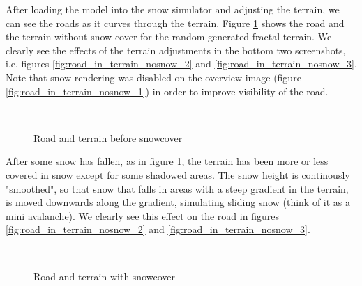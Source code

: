 
After loading the model into the snow simulator and adjusting the terrain, we can see the roads as it curves through the terrain. Figure \ref{fig:road_in_terrain_nosnow} shows the road and the terrain without snow cover for the random generated fractal terrain. We clearly see the effects of the terrain adjustments in the bottom two screenshots, i.e. figures \ref{fig:road_in_terrain_nosnow_2} and \ref{fig:road_in_terrain_nosnow_3}. Note that snow rendering was disabled on the overview image (figure \ref{fig:road_in_terrain_nosnow_1}) in order to improve visibility of the road. 

\begin{figure}[ht]
\centering
{}\\
\quad
{}
\caption{Road and terrain before snowcover}
\label{fig:road_in_terrain_nosnow}
\end{figure}

After some snow has fallen, as in figure \ref{fig:road_in_terrain_nosnow}, the terrain has been more or less covered in snow except for some shadowed areas. The snow height is continously "smoothed", so that snow that falls in areas with a steep gradient in the terrain, is moved downwards along the gradient, simulating sliding snow (think of it as a mini avalanche). We clearly see this effect on the road in figures \ref{fig:road_in_terrain_nosnow_2} and \ref{fig:road_in_terrain_nosnow_3}.

\begin{figure}[ht]
\centering
{}\\
\quad
{}
\caption{Road and terrain with snowcover}
\label{fig:road_in_terrain_snow}
\end{figure}

